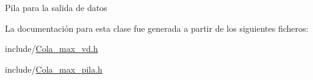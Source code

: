 Pila para la salida de datos 

La documentación para esta clase fue generada a partir de los siguientes ficheros\+:\begin{DoxyCompactItemize}
\item 
include/\hyperlink{Cola__max__vd_8h}{Cola\+\_\+max\+\_\+vd.\+h}\item 
include/\hyperlink{Cola__max__pila_8h}{Cola\+\_\+max\+\_\+pila.\+h}\end{DoxyCompactItemize}
